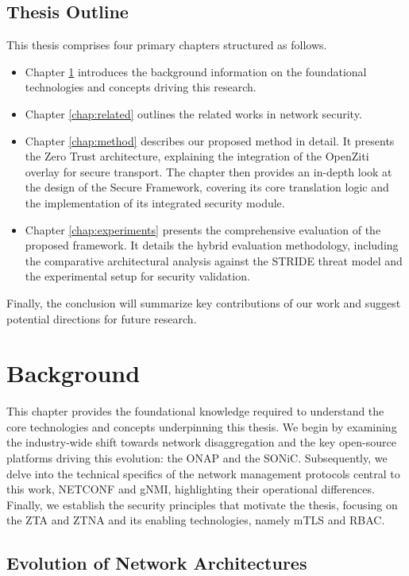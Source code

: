 \documentclass[12pt, a4paper, reqno, oneside]{book}
\newcommand \sect[1]{%
  \section*{#1}%
  \addcontentsline{toc}{section}{#1}}
\begin{document}
\sect{Thesis Outline}
\label{sec:thesis_outline}

This thesis comprises four primary chapters structured as follows.

\begin{itemize}
    \item Chapter \ref{chap:background} introduces the background information on the foundational technologies and concepts driving this research. 

    \item Chapter \ref{chap:related} outlines the related works in network security.

    \item Chapter \ref{chap:method} describes our proposed method in detail. It presents the Zero Trust architecture, explaining the integration of the OpenZiti overlay for secure transport. The chapter then provides an in-depth look at the design of the Secure Framework, covering its core translation logic and the implementation of its integrated security module.

    \item Chapter \ref{chap:experiments} presents the comprehensive evaluation of the proposed framework. It details the hybrid evaluation methodology, including the comparative architectural analysis against the STRIDE threat model and the experimental setup for security validation. 
\end{itemize}

Finally, the conclusion will summarize key contributions of our work and suggest potential directions for future research.


\chapter{Background}
\label{chap:background}

This chapter provides the foundational knowledge required to understand the core technologies and concepts underpinning this thesis. We begin by examining the industry-wide shift towards network disaggregation and the key open-source platforms driving this evolution: the ONAP and the SONiC. Subsequently, we delve into the technical specifics of the network management protocols central to this work, NETCONF and gNMI, highlighting their operational differences. Finally, we establish the security principles that motivate the thesis, focusing on the ZTA and ZTNA and its enabling technologies, namely mTLS and RBAC.

\section{Evolution of Network Architectures}
\end{document}
